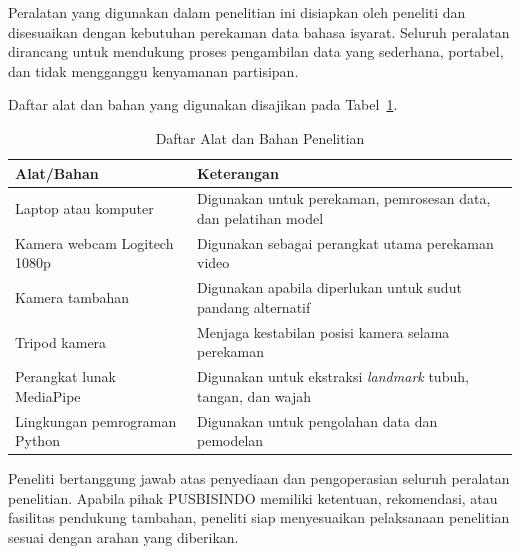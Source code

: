 Peralatan yang digunakan dalam penelitian ini disiapkan oleh peneliti dan disesuaikan dengan kebutuhan perekaman data bahasa isyarat.  
Seluruh peralatan dirancang untuk mendukung proses pengambilan data yang sederhana, portabel, dan tidak mengganggu kenyamanan partisipan.  

Daftar alat dan bahan yang digunakan disajikan pada Tabel~\ref{tab:alat-bahan}.  

\begin{table}[H]
\centering
\caption{Daftar Alat dan Bahan Penelitian}
\label{tab:alat-bahan}
\begin{tabular}{p{5cm} p{6cm}}
\hline
\textbf{Alat/Bahan} & \textbf{Keterangan} \\
\hline
Laptop atau komputer & Digunakan untuk perekaman, pemrosesan data, dan pelatihan model \\
Kamera webcam Logitech 1080p & Digunakan sebagai perangkat utama perekaman video \\
Kamera tambahan & Digunakan apabila diperlukan untuk sudut pandang alternatif \\
Tripod kamera & Menjaga kestabilan posisi kamera selama perekaman \\
Perangkat lunak MediaPipe & Digunakan untuk ekstraksi \textit{landmark} tubuh, tangan, dan wajah \\
Lingkungan pemrograman Python & Digunakan untuk pengolahan data dan pemodelan \\
\hline
\end{tabular}
\end{table}

Peneliti bertanggung jawab atas penyediaan dan pengoperasian seluruh peralatan penelitian.  
Apabila pihak PUSBISINDO memiliki ketentuan, rekomendasi, atau fasilitas pendukung tambahan, peneliti siap menyesuaikan pelaksanaan penelitian sesuai dengan arahan yang diberikan.  